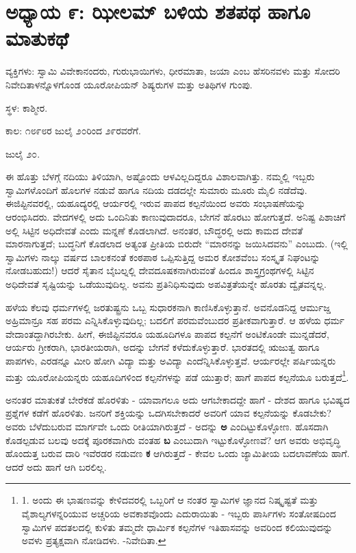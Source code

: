 
\chapter{ಅಧ್ಯಾಯ ೯: ಝೀಲಮ್​ ಬಳಿಯ ಶತಪಥ ಹಾಗೂ ಮಾತುಕಥೆ}

ವ್ಯಕ್ತಿಗಳು: ಸ್ವಾಮಿ ವಿವೇಕಾನಂದರು, ಗುರುಭಾಯಿಗಳು, ಧೀರಮಾತಾ, ಜಯಾ ಎಂಬ ಹೆಸರಿನವಳು ಮತ್ತು ಸೋದರಿ ನಿವೇದಿತಾಳನ್ನೊಳಗೊಂಡ ಯೂರೋಪಿಯನ್ ಶಿಷ್ಯರುಗಳ ಮತ್ತು ಅತಿಥಿಗಳ ಗುಂಪು.

ಸ್ಥಳ: ಕಾಶ್ಮೀರ.

ಕಾಲ: ೧೮೯೮ರ ಜುಲೈ ೨೦ರಿಂದ ೨೯ರವರೆಗೆ.

ಜುಲೈ ೨೦.

ಈ ಹೊತ್ತು ಬೆಳಗ್ಗೆ ನದಿಯು ತಿಳಿಯಾಗಿ, ಅಷ್ಟೊಂದು ಆಳವಿಲ್ಲದಿದ್ದರೂ ವಿಶಾಲವಾಗಿತ್ತು. ನಮ್ಮಲ್ಲಿ ಇಬ್ಬರು ಸ್ವಾಮಿಗಳೊಂದಿಗೆ ಹೊಲಗಳ ನಡುವೆ ಹಾಗೂ ನದಿಯ ದಡದಲ್ಲೇ ಸುಮಾರು ಮೂರು ಮೈಲಿ ನಡೆದೆವು. ಈಜಿಪ್ಟಿನವರಲ್ಲಿ, ಯಹೂದ್ಯರಲ್ಲಿ  ಆರ್ಯರಲ್ಲಿ ಇರುವ ಪಾಪದ ಕಲ್ಪನೆಯಿಂದ ಅವರು ಸಂಭಾಷಣೆಯನ್ನು ಆರಂಭಿಸಿದರು. ವೇದಗಳಲ್ಲಿ ಅದು ಒಂದಿನಿತು ಕಾಣುವುದಾದರೂ, ಬೇಗನೆ ಹೊರಟು ಹೋಗುತ್ತದೆ. ಅನಿಷ್ಟ ಪಿಶಾಚಿಗೆ ಅಲ್ಲಿ ಸಿಟ್ಟಿನ ಅಧಿದೇವತೆ ಎಂದು ಮನ್ನಣೆ ಕೊಡಲಾಗಿದೆ. ಅನಂತರ, ಬೌದ್ಧರಲ್ಲಿ ಅದು ಕಾಮದ ದೇವತೆ ಮಾರನಾಗುತ್ತದೆ; ಬುದ್ಧನಿಗೆ ಕೊಡಲಾದ ಅತ್ಯಂತ ಪ್ರೀತಿಯ ಬಿರುದೇ “ಮಾರನನ್ನು ಜಯಿಸಿದವನು” ಎಂಬುದು. (ಇಲ್ಲಿ ಸ್ವಾಮಿಗಳು ನಾಲ್ಕು ವರ್ಷದ ಬಾಲಕನಂತೆ ಕಂಠಪಾಠ ಒಪ್ಪಿಸುತ್ತಿದ್ದ ಅಮರ ಕೋಶವೆಂಬ ಸಂಸ್ಕೃತ ನಿಘಂಟನ್ನು ನೋಡಬಹುದು!) ಆದರೆ ಸೈತಾನ ಬೈಬಲ್ನಲ್ಲಿ ದೇವದೂಷಕನಾಗಿರುವಂತೆ ಹಿಂದೂ ಶಾಸ್ತ್ರಗ್ರಂಥಗಳಲ್ಲಿ ಸಿಟ್ಟಿನ ಅಧಿದೇವತೆ ಸೃಷ್ಟಿಯನ್ನು ಒಡೆಯುವುದಿಲ್ಲ. ಅವನು ಪ್ರತಿನಿಧಿಸುವುದು ಅಪವಿತ್ರತೆಯನ್ನೇ ಹೊರತು ದ್ವೈತವನ್ನಲ್ಲ.

ಹಳೆಯ ಕೆಲವು ಧರ್ಮಗಳಲ್ಲಿ ಜರತುಷ್ಟ್ರನು ಒಬ್ಬ ಸುಧಾರಕನಾಗಿ ಕಾಣಿಸಿಕೊಳ್ಳುತ್ತಾನೆ. ಅವನೊಡನಿದ್ದ ಆರ್ಮುಜ್ಡ ಅಹ್ರಿಮಾನ್ರೂ ಸಹ ಪರಮ ಎನ್ನಿಸಿಕೊಳ್ಳುವುದಿಲ್ಲ; ಬದಲಿಗೆ ಪರಮವೆಂಬುದರ ಪ್ರತೀಕವಾಗುತ್ತಾರೆ. ಆ ಹಳೆಯ ಧರ್ಮ ವೇದಾಂತದ್ದಾಗಿರಬೇಕು. ಹೀಗೆ, ಈಜಿಪ್ಟಿನವರೂ ಯಹೂದಿಗಳೂ  ಪಾಪದ ಕಲ್ಪನೆಗೆ ಅಂಟಿಕೊಂಡೇ ಮುನ್ನಡೆದರೆ, ಆರ್ಯರು ಗ್ರೀಕರಾಗಿ, ಭಾರತೀಯರಾಗಿ, ಅದನ್ನು ಬೇಗನೆ ಕಳೆದುಕೊಳ್ಳುತ್ತಾರೆ. ಭಾರತದಲ್ಲಿ ಋಜುತ್ವ ಹಾಗೂ ಪಾಪಗಳು, ಎರಡನ್ನೂ ಮೀರಿ ಹೋಗಿ ವಿದ್ಯಾ ಮತ್ತು ಅವಿದ್ಯಾ ಎಂದೆನ್ನಿಸಿಕೊಳ್ಳುತ್ತವೆ. ಆರ್ಯರಲ್ಲೇ ಪರ್ಷಿಯನ್ನರು ಮತ್ತು ಯೂರೋಪಿಯನ್ನರು ಯಹೂದಿಗಳಿಂದ ಕಲ್ಪನೆಗಳನ್ನು ಪಡೆ ಯುತ್ತಾರೆ; ಹಾಗೆ ಪಾಪದ ಕಲ್ಪನೆಯೂ ಬರುತ್ತದೆ\footnote{1. ಅಂದು ಈ ಭಾಷಣವನ್ನು ಕೇಳಿದವರಲ್ಲಿ ಒಬ್ಬರಿಗೆ ಆ ನಂತರ ಸ್ವಾಮಿಗಳ ಜ್ಞಾನದ ನಿಷ್ಕೃಷ್ಟತೆ ಮತ್ತು ವೈಶಾಲ್ಯಗಳನ್ನರಿಯುವ ಅಚ್ಚರಿಯ ಅವಕಾಶವೊಂದು ಎದುರಾಯಿತು - ಇಬ್ಬರು ಪಾರ್ಸಿಗಳು ಸಂತೋಷದಿಂದ ಸ್ವಾಮಿಗಳ ಪದತಲದಲ್ಲಿ ಕುಳಿತು ತಮ್ಮದೇ ಧಾರ್ಮಿಕ ಕಲ್ಪನೆಗಳ ಇತಿಹಾಸವನ್ನು ಅವರಿಂದ ಕಲಿಯುವುದನ್ನು ಅವಳು ಪ್ರತ್ಯಕ್ಷವಾಗಿ ನೋಡಿದಳು. -ನಿವೇದಿತಾ.}.

ಅನಂತರ ಮಾತುಕತೆ ಬೇರೆಕಡೆ ಹೊರಳಿತು - ಯಾವಾಗಲೂ ಅದು ಆಗಬೇಕಾದದ್ದೇ ಹಾಗೆ - ದೇಶದ ಹಾಗೂ ಭವಿಷ್ಯದ ಪ್ರಶ್ನೆಗಳ ಕಡೆಗೆ ಹೊರಳಿತು. ಜನರಿಗೆ ಶಕ್ತಿಯನ್ನು ಒದಗಿಸಬೇಕಾದರೆ ಅವರಿಗೆ ಯಾವ ಕಲ್ಪನೆಯನ್ನು ಕೊಡಬೇಕು? ಅವರು ಬೆಳೆದುಬರುವ ಮಾರ್ಗವೇ ಒಂದು ರೀತಿಯಾಗಿರುತ್ತದೆ - ಅದನ್ನು \textbf{ಅ} ಎಂದಿಟ್ಟುಕೊಳ್ಳೋಣ. ಹೊಸದಾಗಿ ಕೊಡಲ್ಪಡುವ ಬಲವು ಅದಕ್ಕೆ ಪೂರಕವಾಗಿರು ವಂತಹ
 \textbf{ಬ} ಎಂಬುದಾಗಿ ಇಟ್ಟುಕೊಳ್ಳೋಣವೆ? ಆಗ ಅವರು ಅಭಿವೃದ್ಧಿ ಹೊಂದುತ್ತ ಬರುವ ದಾರಿ ಇವೆರಡರ ನಡುವಣ \textbf{ಕ} ಆಗಿರುತ್ತದೆ - ಕೇವಲ ಒಂದು ಜ್ಯಾಮಿತೀಯ ಬದಲಾವಣೆಯ ಹಾಗೆ. ಆದರೆ ಅದು ಹಾಗೆ ಆಗಿ ಬರಲಿಲ್ಲ.


